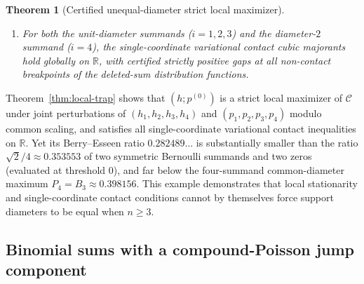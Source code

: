 \documentclass[11pt]{article}
\numberwithin{equation}{section}
\newtheorem{theorem}{Theorem}[section]
\theoremstyle{definition}
\theoremstyle{remark}
\newcommand{\R}{\mathbb R}
\begin{document}
\begin{theorem}[Certified unequal-diameter strict local maximizer]
\begin{enumerate}[label=(\roman*),leftmargin=2em]
gradient $\nabla_p\mathcal C(h;p^{(0)})=0$ and negative-definite probability
Hessian $H_p\preceq -c_H I<0$, a second-order Taylor expansion of $f_{j_*}$
around $(0,p^{(0)})$ with $a=\|d_\perp\|$ and $b=\|\delta p\|$ gives
\[
 \mathcal C(h+d_\perp;p^{(0)}+\delta p)-\mathcal C(h;p^{(0)})
 \le -c_2 a-\frac{c_H}{2}b^2+O(ab+a^2+b^3)<0
\]
for all sufficiently small $(d_\perp,\delta p)\ne(0,0)$, because
$ab\le b(a+b^2)=o(a+b^2)$ and $a^2+b^3=o(a+b^2)$ as $a,b\to0$.
\item For both the unit-diameter summands ($i=1,2,3$) and the diameter-$2$
summand ($i=4$), the single-coordinate variational contact cubic majorants
hold globally on $\R$, with certified strictly positive gaps at all
non-contact breakpoints of the deleted-sum distribution functions.
\end{enumerate}
\end{theorem}

Theorem~\ref{thm:local-trap} shows that $(h;p^{(0)})$ is a strict local
maximizer of $\mathcal C$ under joint perturbations of $(h_1,h_2,h_3,h_4)$ and
$(p_1,p_2,p_3,p_4)$ modulo common scaling, and satisfies all single-coordinate
variational contact inequalities on $\R$. Yet its Berry--Esseen ratio
$0.282489\ldots$ is substantially smaller than the ratio
$\sqrt2/4\approx0.353553$ of two symmetric Bernoulli summands and two zeros
(evaluated at threshold $0$), and far below the four-summand common-diameter
maximum $P_4=B_3\approx0.398156$. This example demonstrates that local
stationarity and single-coordinate contact conditions cannot by themselves
force support diameters to be equal when $n\ge3$.

\subsection{Binomial sums with a compound-Poisson jump component}\label{subsec:cp-data}
\end{document}
